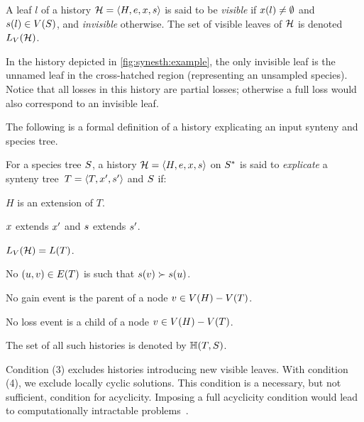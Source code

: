 \begin{definition}
    A leaf \(l\) of a history \(\mathcal{H} = \left\langle H, e, x, s\right\rangle\) is said to be \emph{visible} if \(x(l) \neq \emptyset\) and \(s(l) \in V(S)\), and \emph{invisible} otherwise.
    The set of visible leaves of \(\mathcal{H}\) is denoted \(L_V(\mathcal{H})\).
\end{definition}

In the history depicted in \cref{fig:synesth:example}, the only invisible leaf is the unnamed leaf in the cross-hatched region (representing an unsampled species). Notice that all losses in this history are partial losses; otherwise a full loss would also correspond to an invisible leaf.

The following is a formal definition of a history explicating an input synteny and species tree.

\begin{definition}\label{def:synesth:expl-history}
    For a species tree \(S\),
    a history \(\mathcal{H} = \left\langle H, e, x, s\right\rangle\) on \(S^*\) is said to \emph{explicate} a synteny tree~\(T = \left\langle T, x', s'\right\rangle\) and \(S\) if:
    \begin{condition}
        \item \(H\) is an extension of \(T\).
        \item \(x\) extends \(x'\) and \(s\) extends \(s'\).
        \item \(L_V(\mathcal{H}) = L(T)\).
        \item No \((u, v) \in E(T)\) is such that \(s(v) \succ s(u)\).
        \item\label{def:synesth:expl-history-gain} No gain event is the parent of a node \(v \in V(H) - V(T)\).
        \item\label{def:synesth:expl-history-loss} No loss event is a child of a node \(v \in V(H) - V(T)\).
    \end{condition}
    The set of all such histories is denoted by \(\mathbb{H}(T, S)\).
\end{definition}

Condition (3) excludes histories introducing new visible leaves. With condition (4), we exclude locally cyclic solutions. This condition is a necessary, but not sufficient, condition for acyclicity. Imposing a full acyclicity condition would lead to computationally intractable problems~\parencite{Tofigh2011SimultaneousIdentificationDuplications}.

